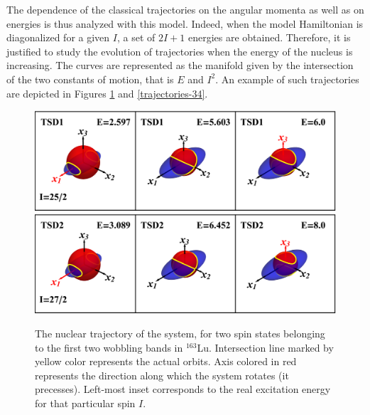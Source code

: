 \documentclass[11pt]{article}
\begin{document}
The dependence of the classical trajectories on the angular momenta as well as on energies is thus analyzed with this model. Indeed, when the model Hamiltonian is diagonalized for a given $I$, a set of $2I+1$ energies are obtained. Therefore, it is justified to study the evolution of trajectories when the energy of the nucleus is increasing. The curves are represented as the manifold given by the intersection of the two constants of motion, that is $E$ and $I^2$. An example of such trajectories are depicted in Figures \ref{trajectories-12} and \ref{trajectories-34}.

\begin{figure}
    \centering
    \includegraphics[scale=0.7]{figs/tsd1_spin1.eps}
    \includegraphics[scale=0.7]{figs/tsd2_spin1.eps}
    \caption{The nuclear trajectory of the system, for two spin states belonging to the first two wobbling bands in $^{163}$Lu. Intersection line marked by yellow color represents the actual orbits. Axis colored in red represents the direction along which the system rotates (it precesses). Left-most inset corresponds to the real excitation energy for that particular spin $I$.}
    \label{trajectories-12}
\end{figure}
\end{document}
